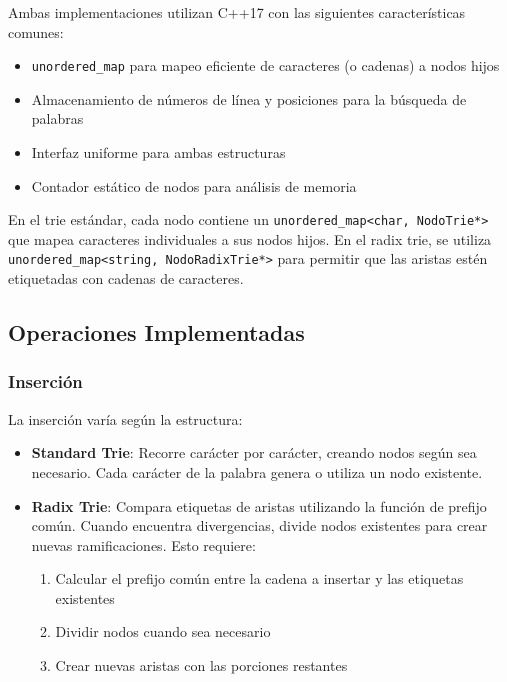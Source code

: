 \documentclass[11pt,a4paper]{article}
\begin{document}
Ambas implementaciones utilizan C++17 con las siguientes características comunes:

\begin{itemize}
    \item \texttt{unordered\_map} para mapeo eficiente de caracteres (o cadenas) a nodos hijos
    \item Almacenamiento de números de línea y posiciones para la búsqueda de palabras
    \item Interfaz uniforme para ambas estructuras
    \item Contador estático de nodos para análisis de memoria
\end{itemize}

En el trie estándar, cada nodo contiene un \texttt{unordered\_map<char, NodoTrie*>} que mapea caracteres individuales a sus nodos hijos. En el radix trie, se utiliza \texttt{unordered\_map<string, NodoRadixTrie*>} para permitir que las aristas estén etiquetadas con cadenas de caracteres.

\subsection{Operaciones Implementadas}

\subsubsection{Inserción}

La inserción varía según la estructura:

\begin{itemize}
    \item \textbf{Standard Trie}: Recorre carácter por carácter, creando nodos según sea necesario. Cada carácter de la palabra genera o utiliza un nodo existente.
    
    \item \textbf{Radix Trie}: Compara etiquetas de aristas utilizando la función de prefijo común. Cuando encuentra divergencias, divide nodos existentes para crear nuevas ramificaciones. Esto requiere:
    \begin{enumerate}
        \item Calcular el prefijo común entre la cadena a insertar y las etiquetas existentes
        \item Dividir nodos cuando sea necesario
        \item Crear nuevas aristas con las porciones restantes
    \end{enumerate}
\end{itemize}
\end{document}
